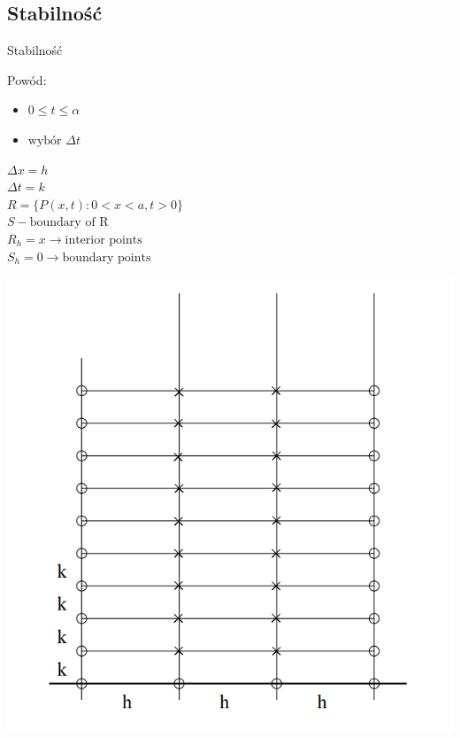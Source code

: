 
\subsection{Stabilność}
\begin{frame}{Stabilność}
  \begin{block}{Powód:}
\begin{itemize}
    \item $ 0  \le t \leq \alpha $
    \item $\text{wybór } \Delta t $
\end{itemize}
  \end{block}
    
      $\Delta x = h $ \\
      $\Delta t = k$ \\
      $ R = \{P(x,t): 0 < x < a, t > 0\}$ \\
      $S - \text{boundary of R}$ \\
      $R_h = x \rightarrow \text{interior points}$ \\
      $S_h = 0 \rightarrow \text{boundary points}$
  \end{frame}

\begin{frame}
  \centerline{\includegraphics[height = 0.85 \textheight]{img/23/stabilnosc}}
\end{frame}

